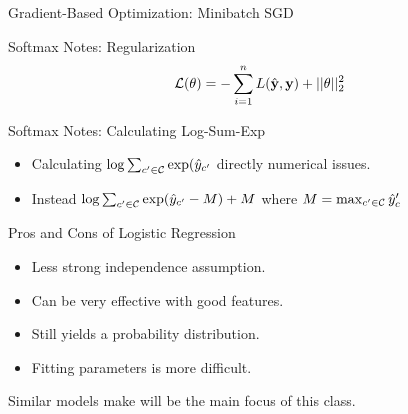 \documentclass{beamer}
\begin{document}
\begin{frame}{Gradient-Based Optimization: Minibatch SGD}
  \begin{figure}
    \begin{algorithmic}
      \EndFor{}
      \EndWhile{}
      \State{\Return{$\theta$}}
    \end{algorithmic}
  \end{figure}

\end{frame}

\begin{frame}{Softmax Notes: Regularization}
  \[ \mathcal{L}(\theta) = - \sum_{i=1}^n L(\hat{\mathbf{y}}, \mathbf{y}) + ||\theta||^2_2\] 
\end{frame}

\begin{frame}{Softmax Notes: Calculating Log-Sum-Exp}
  \begin{itemize}
  \item Calculating $\log \sum_{c' \in \mathcal{C}} \exp(\hat{y}_{c'}$ directly numerical issues.
  \item Instead $\log \sum_{c' \in \mathcal{C}} \exp(\hat{y}_{c'} - M) + M$ where $M = \max_{c'\in\mathcal{C}} \hat{y}_c'$ 
  \end{itemize}
\end{frame}


\begin{frame}{Pros and Cons of Logistic Regression}
  \begin{itemize}
  \item Less strong independence assumption.
  \item Can be very effective with good features.
  \item Still yields a probability distribution.
  \item Fitting parameters is more difficult.
  \end{itemize}
  
  Similar models make will be the main focus of this class.
\end{frame}
\end{document}
